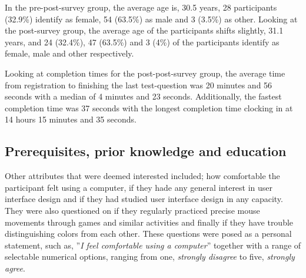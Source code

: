   In the pre-post-survey group, the average age is, 30.5 years, 28
  participants (32.9\%) identify as female, 54 (63.5\%) as male and 3
  (3.5\%) as other. Looking at the post-survey group, the average age of
  the participants shifts slightly, 31.1 years, and 24 (32.4\%), 47
  (63.5\%) and 3 (4\%) of the participants identify as female, male and
  other respectively.

  Looking at completion times for the post-post-survey group, the average
  time from registration to finishing the last test-question was 20 minutes
  and 56 seconds with a median of 4 minutes and 23 seconds. Additionally,
  the fastest completion time was 37 seconds with the longest completion
  time clocking in at 14 hours 15 minutes and 35 seconds.

  \subsection{Prerequisites, prior knowledge and education}

  Other attributes that were deemed interested included; how comfortable
  the participant felt using a computer, if they hade any general interest
  in user interface design and if they had studied user interface design in
  any capacity. They were also questioned on if they regularly practiced
  precise mouse movements through games and similar activities and finally
  if they have trouble distinguishing colors from each other. These
  questions were posed as a personal statement, such as, ''\textit{I feel
    comfortable using a computer}'' together with a range of selectable
  numerical options, ranging from one, \textit{strongly disagree} to five,
  \textit{strongly agree}.

%
%



%
%
%
%
%
%
%

